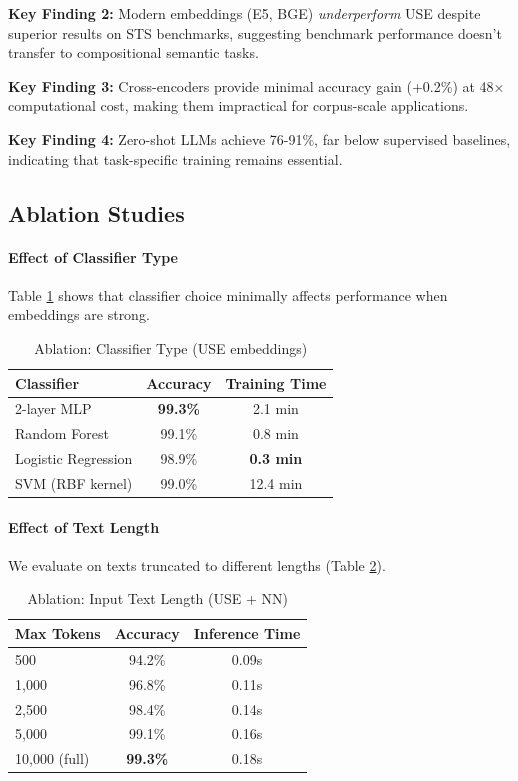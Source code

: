 \documentclass[11pt]{article}
\begin{document}
\textbf{Key Finding 2:} Modern embeddings (E5, BGE) \textit{underperform} USE despite superior results on STS benchmarks, suggesting benchmark performance doesn't transfer to compositional semantic tasks.

\textbf{Key Finding 3:} Cross-encoders provide minimal accuracy gain (+0.2\%) at 48× computational cost, making them impractical for corpus-scale applications.

\textbf{Key Finding 4:} Zero-shot LLMs achieve 76-91\%, far below supervised baselines, indicating that task-specific training remains essential.

\subsection{Ablation Studies}

\paragraph{Effect of Classifier Type}
Table \ref{tab:ablation_classifier} shows that classifier choice minimally affects performance when embeddings are strong.

\begin{table}[h]
\centering
\small
\caption{Ablation: Classifier Type (USE embeddings)}
\label{tab:ablation_classifier}
\begin{tabular}{lcc}
\toprule
\textbf{Classifier} & \textbf{Accuracy} & \textbf{Training Time} \\
\midrule
2-layer MLP & \textbf{99.3\%} & 2.1 min \\
Random Forest & 99.1\% & 0.8 min \\
Logistic Regression & 98.9\% & \textbf{0.3 min} \\
SVM (RBF kernel) & 99.0\% & 12.4 min \\
\bottomrule
\end{tabular}
\end{table}

\paragraph{Effect of Text Length}
We evaluate on texts truncated to different lengths (Table \ref{tab:ablation_length}).

\begin{table}[h]
\centering
\small
\caption{Ablation: Input Text Length (USE + NN)}
\label{tab:ablation_length}
\begin{tabular}{lcc}
\toprule
\textbf{Max Tokens} & \textbf{Accuracy} & \textbf{Inference Time} \\
\midrule
500 & 94.2\% & 0.09s \\
1,000 & 96.8\% & 0.11s \\
2,500 & 98.4\% & 0.14s \\
5,000 & 99.1\% & 0.16s \\
10,000 (full) & \textbf{99.3\%} & 0.18s \\
\bottomrule
\end{tabular}
\end{table}
\end{document}
